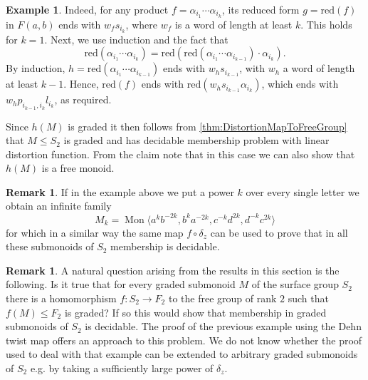 \documentclass[11pt]{amsart}
\newcommand{\Mgen}[1]{\operatorname{Mon}\bigl\langle #1 \bigr\rangle}
\theoremstyle{plain}
\theoremstyle{definition}
\newtheorem{example}[theorem]{Example}
\newtheorem{remark}[theorem]{Remark}
\begin{document}
\begin{example}
Indeed, for any product $f = \alpha_{i_1} \cdots \alpha_{i_k}$, its reduced form $g = \text{red}(f)$ in $F(a, b)$ ends with $w_fs_{i_k}$, where $w_f$ is a word of length at least $k$.
This holds for $k = 1$. Next, we use induction and the fact that
\[
\text{red}(\alpha_{i_1} \cdots \alpha_{i_k}) = \text{red}(\text{red}(\alpha_{i_1} \cdots \alpha_{i_{k-1}}) \cdot \alpha_{i_k}).
\]
By induction, $h = \text{red}(\alpha_{i_1} \cdots \alpha_{i_{k-1}})$ ends with $w_h s_{i_{k-1}}$, with $w_h$ a word of length at least $k-1$. Hence, $\text{red}(f)$ ends with $\text{red}(w_h s_{i_{k-1}} \alpha_{i_k})$, which ends with $w_h p_{i_{k - 1}, i_k} l_{i_k}$, as required.

Since $h(M)$ is graded it then follows from \cref{thm:DistortionMapToFreeGroup} that  
$M \leq S_2$ is graded and has decidable membership problem with linear distortion function.
From the claim note that in this case we can also show that $h(M)$ is a free monoid. 
\end{example}





  













\begin{remark}
If in the example above we put a power $k$ over every single letter we obtain an infinite family
    \[M_k = \Mgen{a^k b^{-2k}, b^ka^{-2k}, c^{-k}d^{2k}, d^{-k} c^{2k}}
    \]
for which in a similar way the same map $f \circ \delta_z$ can be used to prove that  
in all these submonoids of $S_2$ membership is decidable.
\end{remark}

\begin{remark}
A natural question arising from the results in this section is the following. Is it true that for every graded submonoid $M$ of the surface group $S_2$ there is a homomorphism $f:S_2 \rightarrow F_2$ to the free group of rank $2$ such that $f(M) \leq F_2$ is graded? If so this would show that membership in graded submonoids of $S_2$ is decidable. The proof of the previous example using the Dehn twist map offers an approach to this problem. We do not know whether the proof used to deal with that example can be extended to arbitrary graded submonoids of $S_2$ e.g. by taking a sufficiently large power of $\delta_z$. 
\end{remark}
\end{document}
